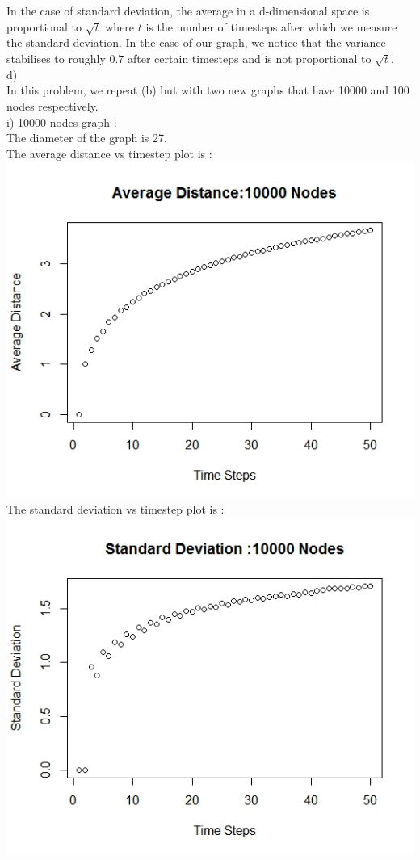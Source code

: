 \documentclass{article}
\begin{document}
In the case of standard deviation, the average in a d-dimensional space is proportional to $\sqrt t$
where $t$ is the number of timesteps after which we measure the standard deviation. In the case of our graph,
we notice that the variance stabilises to roughly $0.7$ after certain timesteps and is not proportional to $\sqrt t$.\\

d)\\
In this problem, we repeat (b) but with two new graphs that have 10000 and 100 nodes respectively.\\
i) 10000 nodes graph :\\
The diameter of the graph is 27.\\
The average distance vs timestep plot is :\\
\includegraphics[scale=0.4]{p2i} \\
The standard deviation vs timestep plot is :\\
\includegraphics[scale=0.4]{p2k} \\
\end{document}
